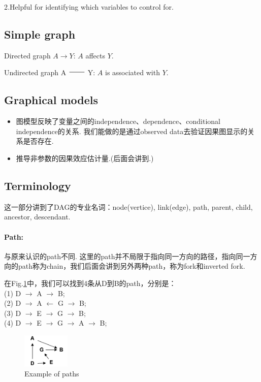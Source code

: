 2.Helpful for identifying which variables to control for.

\subsection{Simple graph}
Directed graph $A \longrightarrow Y$: $A$ affects $Y$.

Undirected graph A $\rule[4pt]{0.8cm}{0.05em}$ Y: $A$ is associated with $Y$.\\

\subsection{Graphical models}
\begin{itemize}
	\item 图模型反映了变量之间的independence、dependence、conditional independence的关系. 我们能做的是通过observed data去验证因果图显示的关系是否存在.
	\item 推导非参数的因果效应估计量.(后面会讲到.)
\end{itemize}

\subsection{Terminology}
这一部分讲到了DAG的专业名词：node(vertice), link(edge), path, parent, child, ancestor, descendant.

\paragraph{Path:}与原来认识的path不同. 这里的path并不局限于指向同一方向的路径，指向同一方向的path称为chain，我们后面会讲到另外两种path，称为fork和inverted fork.
\begin{ex}
	在Fig.\ref{expath}中，我们可以找到4条从D到B的path，分别是：\\
	(1) D $\longrightarrow$ A $\longrightarrow$ B; \\
	(2) D $\longrightarrow$ A $\longleftarrow$ G $\longrightarrow$ B;\\
	(3) D $\longrightarrow$ E $\longrightarrow$ G $\longrightarrow$ B;\\
	(4) D $\longrightarrow$ E $\longrightarrow$ G
	$\longrightarrow$ A $\longrightarrow$ B;
\end{ex}
\begin{figure}[htbp]
	\setlength{\abovecaptionskip}{0pt}     %
	\setlength{\belowcaptionskip}{10pt}
	\vspace{-0cm}  %
	\setlength{\abovecaptionskip}{-0cm}   %
	\setlength{\belowcaptionskip}{-0cm}   %
	\centering
	\includegraphics[width=0.2\textwidth]{figure/expath.png}
	\caption{Example of paths}
	\label{expath}
\end{figure}

